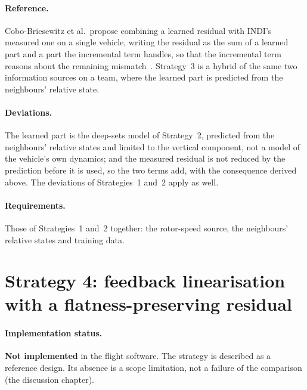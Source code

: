 \paragraph{Reference.} Cobo-Briesewitz et al.\ propose combining a learned residual with INDI's
measured one on a single vehicle, writing the residual as the sum of a learned part and a part the
incremental term handles, so that the incremental term reasons about the remaining
mismatch~\cite{cobobriesewitz2026lindi}. Strategy~3 is a hybrid of the same two information
sources on a team, where the learned part is predicted from the neighbours' relative state.

\paragraph{Deviations.} The learned part is the deep-sets model of Strategy~2, predicted from the
neighbours' relative states and limited to the vertical component, not a model of the vehicle's own
dynamics; and the measured residual is not reduced by the prediction before it is used, so the two
terms add, with the consequence derived above. The deviations of Strategies~1 and~2 apply as well.

\paragraph{Requirements.} Those of Strategies~1 and~2 together: the rotor-speed source, the
neighbours' relative states and training data.

\section{Strategy 4: feedback linearisation with a flatness-preserving residual}
\label{sec:ctrl-s4}

\paragraph{Implementation status.} \textbf{Not implemented} in the flight software. The strategy is
described as a reference design. Its absence is a scope limitation, not a failure of the
comparison (the discussion chapter).

